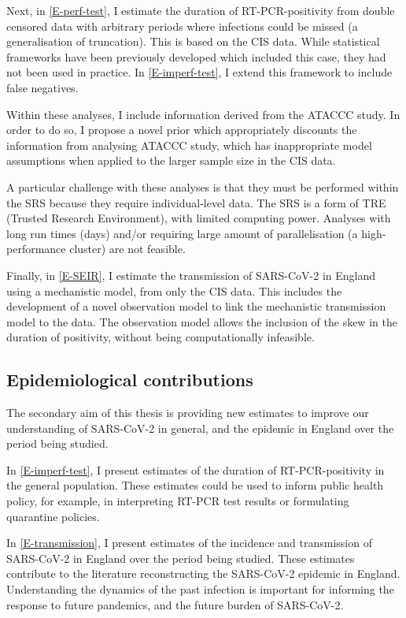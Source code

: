 \documentclass[thesis.tex]{subfiles}
\begin{document}
Next, in \cref{E-perf-test}, I estimate the duration of RT-PCR-positivity from double censored data with arbitrary periods where infections could be missed (a generalisation of truncation).
This is based on the CIS data.
While statistical frameworks have been previously developed which included this case, they had not been used in practice.
In \cref{E-imperf-test}, I extend this framework to include false negatives.

Within these analyses, I include information derived from the ATACCC study.
In order to do so, I propose a novel prior which appropriately discounts the information from analysing ATACCC study, which has inappropriate model assumptions when applied to the larger sample size in the CIS data.

A particular challenge with these analyses is that they must be performed within the SRS because they require individual-level data.
The SRS is a form of TRE (Trusted Research Environment), with limited computing power.
Analyses with long run times (\ie days) and/or requiring large amount of parallelisation (\eg a high-performance cluster) are not feasible.

Finally, in \cref{E-SEIR}, I estimate the transmission of SARS-CoV-2 in England using a mechanistic model, from only the CIS data.
This includes the development of a novel observation model to link the mechanistic transmission model to the data.
The observation model allows the inclusion of the skew in the duration of positivity, without being computationally infeasible.

\subsection{Epidemiological contributions}

The secondary aim of this thesis is providing new estimates to improve our understanding of SARS-CoV-2 in general, and the epidemic in England over the period being studied.

In \cref{E-imperf-test}, I present estimates of the duration of RT-PCR-positivity in the general population.
These estimates could be used to inform public health policy, for example, in interpreting RT-PCR test results or formulating quarantine policies.

In \cref{E-transmission}, I present estimates of the incidence and transmission of SARS-CoV-2 in England over the period being studied.
These estimates contribute to the literature reconstructing the SARS-CoV-2 epidemic in England.
Understanding the dynamics of the past infection is important for informing the response to future pandemics, and the future burden of SARS-CoV-2.
\end{document}
